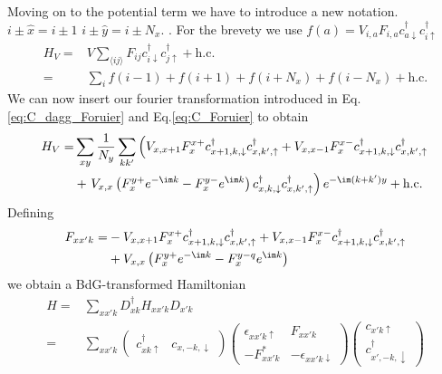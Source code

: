 \documentclass[../main.tex]{subfile}
\begin{document}
Moving on to the potential term we have to introduce a new notation. $i\pm\hat{x} = i\pm 1$  $i\pm\hat{y} = i\pm N_x$. .
For the brevety we use $f(a) = V_{i,a}F_{i,a} c^{\dagger}_{a\downarrow} c^{\dagger}_{i\uparrow}$
\begin{align*}
    H_V =& V \sum_{\langle ij\rangle} F_{ij} c^{\dagger}_{i\downarrow} c^{\dagger}_{j\uparrow} + \text{h.c.} \\
    =& \sum_{i} f(i-1) + f(i+1) + f(i+N_x) + f(i-N_x) + \text{h.c.}
\end{align*}
We can now insert our fourier transformation introduced in Eq.\ref{eq:C_dagg_Foruier} and Eq.\ref{eq:C_Foruier} to obtain
\begin{align*}
    H_V =& \sum_{xy} \frac{1}{N_y} \sum_{kk'} \left( V_{x,x+1} F_{x}^{x+} c^{\dagger}_{x+1,k,\downarrow}c^{\dagger}_{x,k',\uparrow} + V_{x,x-1} F_{x}^{x-} c^{\dagger}_{x+1,k,\downarrow} c^{\dagger}_{x,k',\uparrow} \right.\\
        &+ \left.V_{x,x}\left( F_{x}^{y+} e^{-\im k}  - F_{x}^{y-} e^{\im k}\right) c^{\dagger}_{x,k,\downarrow} c^{\dagger}_{x,k',\uparrow} \right) e^{-\im(k + k')y} + \text{h.c.}\\
\end{align*}
Defining 
\begin{equation*}
    \begin{aligned}
    F_{xx'k} =& - V_{x,x+1} F_{x}^{x+} c^{\dagger}_{x+1,k,\downarrow}c^{\dagger}_{x,k',\uparrow} + V_{x,x-1} F_{x}^{x-} c^{\dagger}_{x+1,k,\downarrow} c^{\dagger}_{x,k',\uparrow} \\
        &+ V_{x,x}\left( F_{x}^{y+} e^{-\im k}  - F_{x}^{y-q} e^{\im k}\right)
    \end{aligned}
\end{equation*}
we obtain a BdG-transformed Hamiltonian
\begin{align*}
    H =& \sum_{xx'k} D_{xk}^{\dagger} H_{xx'k} D_{x'k}\\
      =& \sum_{xx'k} \begin{pmatrix}
        c^{\dagger}_{xk\uparrow} & c_{x,-k,\downarrow}
      \end{pmatrix}
        \begin{pmatrix}
            \epsilon_{xx'k\uparrow} & F_{xx'k}\\
            -F_{xx'k}^{\ast} & -\epsilon_{xx'k\downarrow}
        \end{pmatrix}
        \begin{pmatrix}
            c_{x'k\uparrow}\\
            c^{\dagger}_{x',-k,\downarrow}
        \end{pmatrix}
\end{align*}
\end{document}
